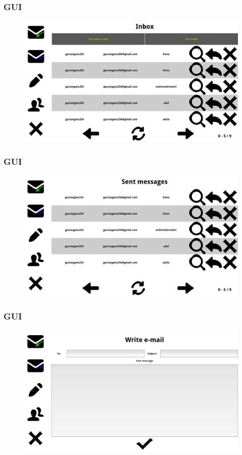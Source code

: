 \documentclass[9pt]{beamer}
\begin{document}
			\begin{frame}
				\frametitle{GUI}
				\begin{figure}
					\centering
					\includegraphics[scale=0.2]{Images/Inbox.png}
				\end{figure}
		    	\end{frame}
			
			\begin{frame}
				\frametitle{GUI}
				\begin{figure}
					\centering
					\includegraphics[scale=0.2]{Images/Outbox.png}
				\end{figure}
		    	\end{frame}
		    	
		    	\begin{frame}
				\frametitle{GUI}
				\begin{figure}
					\centering
					\includegraphics[scale=0.2]{Images/Write_blank.png}
				\end{figure}
		    	\end{frame}
		    	
\end{document}
